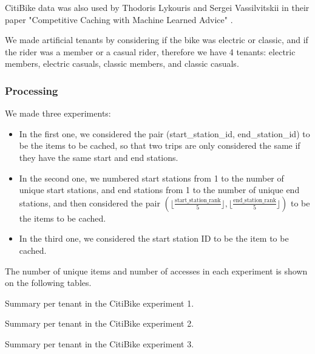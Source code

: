 CitiBike data was also used by Thodoris Lykouris and Sergei Vassilvitskii in their paper "Competitive 
Caching with Machine Learned Advice" \cite{datasets-reference}.

We made artificial tenants by considering if the bike was electric or classic, and if the rider 
was a member or a casual rider, therefore we have 4 tenants: electric members, electric casuals,
classic members, and classic casuals.

\subsubsection{Processing}

We made three experiments: 

\begin{itemize}
    \item In the first one, we considered the pair (start\_station\_id, end\_station\_id) to be 
    the items to be cached, so that two trips are only considered the same if they have the 
    same start and end stations.
    \item In the second one, we numbered start stations from 1 to the number of unique start 
    stations, and end stations from 1 to the number of unique end stations, and then considered 
    the pair \(\left(\lfloor \frac{\text{start\_station\_rank}}{5} \rfloor, \lfloor \frac{\text{end\_station\_rank}}{5} \rfloor\right)\) 
    to be the items to be cached.
    \item In the third one, we considered the start station ID to be the item to be cached.
\end{itemize}

The number of unique items and number of accesses in each experiment is shown on the following tables.

\begin{table}[ht]
    \centering
    \small
    \caption{Summary per tenant in the CitiBike experiment 1.}
    \label{tab:citibike-exp-1-case-2-summary}
\end{table}

\begin{table}[ht]
    \centering
    \small
    \caption{Summary per tenant in the CitiBike experiment 2.}
    \label{tab:citibike-exp-2-case-3-summary}
\end{table}

\begin{table}[ht]
    \centering
    \small
    \caption{Summary per tenant in the CitiBike experiment 3.}
    \label{tab:citibike-exp-3-case-4-summary}
\end{table}

